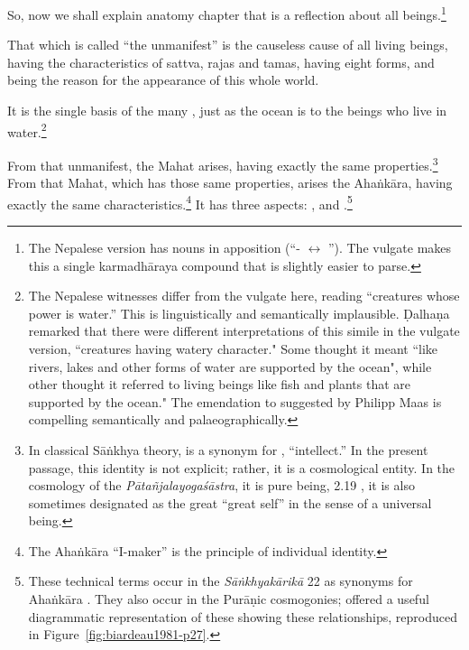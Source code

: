 \begin{translation}
    
    \item [1] 
    
    So, now we shall explain anatomy chapter that is a reflection about all 
    beings.\footnote{The Nepalese version has nouns in apposition 
    (“- $\leftrightarrow$ ”).  The vulgate makes this a 
    single 
    karmadhāraya compound that is slightly easier to parse.} 
    
\item[3]


That which is called “the unmanifest” is the causeless cause of all living beings,  
having the characteristics of sattva, rajas and tamas, having eight forms, and 
being the reason for the appearance of this whole world.
    
It is the single basis of the many , just as the ocean is to the beings who live in
water.\footnote{The Nepalese witnesses differ from the vulgate here,
    reading  “creatures whose power is water.”  This is
    linguistically and semantically implausible. Ḍalhaṇa remarked that
    there were different interpretations of this simile in the vulgate
    version,  “creatures having watery character." Some
    thought it meant ``like rivers, lakes and other forms of water are
    supported by the ocean", while other thought it referred to living
    beings like fish and plants that are supported by the ocean." The
    emendation to  suggested by Philipp Maas is compelling
    semantically and palaeographically.}
    
\item[3.1.4]

From that unmanifest, the Mahat arises, having exactly the same
properties.\footnote{In classical Sāṅkhya theory,  is a
    synonym for , ``intellect.''  In the present passage, this
    identity is not explicit; rather, it is a cosmological entity.  In the
    cosmology of the \emph{Pātañjalayogaśāstra}, it is pure being,
     2.19 \citep[85]{agas-1904}, it is also sometimes
    designated as the great  ``great self'' in the sense of a
    universal being.} %
    From that Mahat, which has those same properties, arises the
    Ahaṅkāra, having exactly the same characteristics.\footnote{The
        Ahaṅkāra ``I-maker'' is the principle of individual identity.}  It
        has three aspects: , 
        and .\footnote{\label{puraniccosmology}These 
        technical terms occur in the \emph{Sāṅkhyakārikā} 22 as synonyms for 
        Ahaṅkāra \parencites[46--47]{sast-1948}[187--188]{wezl-1998}. They 
        also occur in the Purāṇic cosmogonies; \citet[27]{biar-1981} offered a 
        useful diagrammatic representation of these showing these relationships, 
        reproduced in Figure~\ref{fig:biardeau1981-p27}.}
          

\end{translation}
